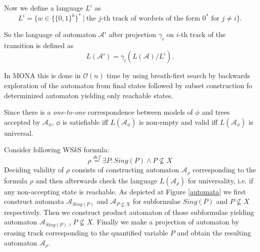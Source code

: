 Now we define a language $L^i$ as
\begin{equation}
 L^i = \{w \in \{\{0, 1\}^k\}^*\ |\ \text{the $j$-th track of word} \mathit{w}
 \text{is of the form $0^*$ for $j \neq i$}\}. \end{equation}
 
 So the language of automaton $\mathcal{A}'$ after projection $\gamma_i$ on
 $i$-th track of the transition is defined as
 \begin{equation}
  L(\mathcal{A}') = \gamma_i(L(\mathcal{A}) / L^i).
 \end{equation}
 
 In \textsc{MONA} \cite{mona} this is done in $\mathcal{O}(n)$ time by using
 breath-first search by backwards exploration of the automaton from final
 states followed by subset construction fo determinized automaton yielding only
 reachable states.

\begin{prop}
 Since there is a \emph{one-to-one} correspondence between models of $\phi$ and
 trees accepted by $\mathcal{A}_\phi$, $\phi$ is satisfiable iff
 $L(\mathcal{A}_\phi)$ is non-empty and valid iff $L(\mathcal{A}_\phi)$  is
 universal.
\end{prop}

  \noindent\hrulefill
  \begin{example}
  Consider following WS$k$S formula:
  \begin{equation}
  \rho \overset{\mathit{def}}{=} \exists P:
 Sing(P) \wedge P \not\subseteq X
  \end{equation}
  Deciding validity of $\rho$ consists of constructing automaton
  $\mathcal{A}_\rho$ corresponding to the formula $\rho$ and then afterwards
  check the language $L(\mathcal{A}_\rho)$ for universality, i.e. if any
  non-accepting state is reachable. As depicted at Figure \ref{automata} we
  first construct automata $\mathcal{A}_{\mathit{Sing}(P)}$ and
  $\mathcal{A}_{P \not\subseteq X}$ for subformulae $\mathit{Sing}(P)$ and $P
  \not\subseteq X$ respectively. Then we construct product automaton of those
  subformulae yielding automaton $\mathcal{A}_{\mathit{Sing}(P) \wedge } P
  \not\subseteq X$. Finally we make a projection of automaton by erasing track
  corresponding to the quantified variable $P$ and obtain the resulting
  automaton $\mathcal{A}_\rho$.

  \end{example}\label{wsks-formula-restricted}
 
